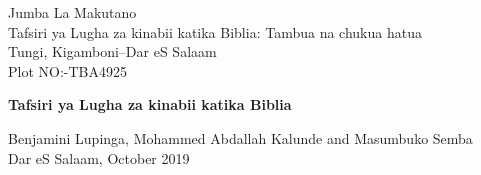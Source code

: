 \begin{titlepage}
\vspace * {-2.5cm}	
	Jumba La Makutano\\
	Tafsiri ya Lugha za kinabii katika Biblia: Tambua na chukua hatua\\
	Tungi, Kigamboni--Dar eS Salaam\\
	Plot NO:-TBA4925 
	
\begin{center}

\vspace * {5cm}
\huge \textbf{Tafsiri ya Lugha za kinabii katika Biblia}

%
%


\vspace * {2cm}

\large
Benjamini Lupinga, Mohammed Abdallah Kalunde and Masumbuko Semba\\ 

\large
Dar eS Salaam, October 2019\\ 


\end{center}


\end{titlepage}


